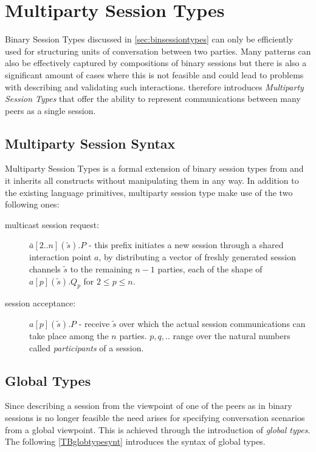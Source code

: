 		
		
\section{Multiparty Session Types}
\label{sec:mpsessiontypes}

Binary Session Types discussed in \autoref{sec:binsessiontypes} can only be efficiently used for structuring units of conversation between two parties. Many patterns can also be effectively captured by compositions of binary sessions but there is also a significant amount of cases where this is not feasible and could lead to problems with describing and validating such interactions. \cite{multiparty_sess_types} therefore introduces \textit{Multiparty Session Types} that offer the ability to represent communications between many peers as a single session.

\subsection{Multiparty Session Syntax}

Multiparty Session Types is a formal extension of binary session types from \cite{language_primitives} and it inherits all constructs without manipulating them in any way. In addition to the existing language primitives, multiparty session type make use of the two following ones:

\begin{description}
\item[multicast session request:] 
$\bar{a}[2..n](\tilde{s}).P$ - this prefix initiates a new session through a shared interaction point $a$, by distributing a vector of freshly generated session channels $\tilde{s}$ to the remaining $n-1$ parties, each of the shape of $a[p](\tilde{s}).Q_{p}$ for $ 2 \leq p \leq n$. 

\item[session acceptance:] $a[p](\tilde{s}).P$ - receive $\tilde{s}$ over which the actual session communications can take place among the $n$ parties. $p, q, ..$ range over the natural numbers called \textit{participants} of a session.
\end{description}

\subsection{Global Types}
Since describing a session from the viewpoint of one of the peers as in binary sessions is no longer feasible the need arises for specifying conversation scenarios from a global viewpoint. This is achieved through the introduction of \textit{global types}. The following \autoref{TBglobtypesynt} introduces the syntax of global types.


